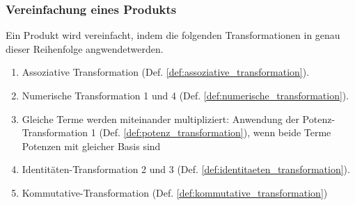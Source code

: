 \documentclass[11pt]{article}
\newcommand{\lab}[1]{(Def. \ref{#1})}
\begin{document}
\subsubsection{Vereinfachung eines Produkts}
Ein Produkt wird vereinfacht, indem die folgenden 
Transformationen in genau dieser Reihenfolge angwendetwerden.
\begin{enumerate}
  \item Assoziative Transformation \lab{def:assoziative_transformation}.
  \item Numerische Transformation 1 und 4 \lab{def:numerische_transformation}.
  \item Gleiche Terme werden miteinander multipliziert: Anwendung der Potenz-Transformation 1 
        \lab{def:potenz_transformation}, wenn beide Terme Potenzen mit gleicher Basis sind
  \item Identitäten-Transformation 2 und 3 \lab{def:identitaeten_transformation}.
  \item Kommutative-Transformation \lab{def:kommutative_transformation}
\end{enumerate}
\end{document}
